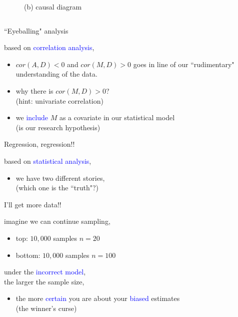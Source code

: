 \begin{frame}
\begin{columns}
\begin{column}{0.5\textwidth}
\begin{figure}
				\caption*{(b) causal diagram}
			\end{figure}
		\end{column}
	\end{columns}
\end{frame}
%
%
\begin{lhframe}[rhgraphic={\texttt{[image: fork1\_panel.pdf]}}]
	{``Eyeballing" analysis}
	
	based on \textcolor{blue}{correlation analysis},
	\begin{itemize}
		\item $cor(A, D)<0$ and $cor(M, D)>0$ goes in line of our ``rudimentary" understanding of the data.
		\item why there is $cor(M, D)>0$? \\
		{\small (hint: univariate correlation)}
		\item we \textcolor{blue}{include} $M$ as a covariate in our statistical model \\
		{\small (is our research hypothesis)}
	\end{itemize}
\end{lhframe}
%
%
\begin{lhframe}[rhgraphic={\texttt{[image: fork1\_reg.png]}}]
	{Regression, regression!!}
	
	based on \textcolor{blue}{statistical analysis},
	\begin{itemize}
		\item we have two different stories, \\
		{\small (which one is the ``truth"?)}
	\end{itemize}
\end{lhframe}
%
%
\begin{lhframe}[rhgraphic={\texttt{[image: fork1\_samplesize.pdf]}}]
	{I'll get more data!!}
	
	imagine we can continue sampling,
	\begin{itemize}
		\item top: $10,000$ samples $n=20$
		\item bottom: $10,000$ samples $n=100$
	\end{itemize}

	under the \textcolor{blue}{incorrect model}, \\
	the larger the sample size,
	\begin{itemize}
		\item the more \textcolor{blue}{certain} you are about your \textcolor{blue}{biased} estimates \\
		{\small \alert{(the winner's curse)}}
	\end{itemize}
\end{lhframe}
